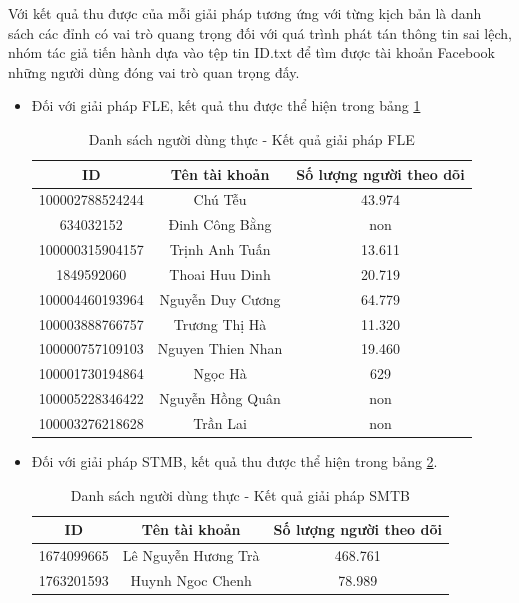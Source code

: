 Với kết quả thu được của mỗi giải pháp tương ứng với từng kịch bản là danh sách các đỉnh có vai trò quang trọng đối với quá trình phát tán thông tin sai lệch, nhóm tác giả tiến hành dựa vào tệp tin ID.txt để tìm được tài khoản Facebook những người dùng đóng vai trò quan trọng đấy.

\begin{itemize}
	\item Đối với giải pháp FLE, kết quả thu được thể hiện trong bảng \ref{anhxafle}
	\begin{table} [H]
		\centering
		\begin{tabular}{|c|c|c|}
			\hline
			\textbf{ID} & \textbf{Tên tài khoản} & \textbf{Số lượng người theo dõi}\\
			\hline
			100002788524244 & Chú Tễu & 43.974\\
			\hline
			634032152 & Đinh Công Bằng & non\\
			\hline
			100000315904157 & Trịnh Anh Tuấn & 13.611\\
			\hline
			1849592060 & Thoai Huu Dinh & 20.719\\
			\hline
			100004460193964 & Nguyễn Duy Cương & 64.779\\
			\hline
			100003888766757 & Trương Thị Hà & 11.320\\
			\hline 
			100000757109103 & Nguyen Thien Nhan & 19.460\\
			\hline 
			100001730194864 & Ngọc Hà & 629\\
			\hline
			100005228346422 & Nguyễn Hồng Quân & non\\
			\hline
			100003276218628 & Trần Lai & non\\
			\hline
		\end{tabular}
		\caption{Danh sách người dùng thực - Kết quả giải pháp FLE}
		\label{anhxafle} 
	\end{table}
	
	\item Đối với giải pháp STMB, kết quả thu được thể hiện trong bảng \ref{anhxastmb}.
	
	\begin{table} [H]
		\centering
		\begin{tabular}{|c|c|c|}
			\hline
			\textbf{ID} & \textbf{Tên tài khoản} & \textbf{Số lượng người theo dõi}\\
			\hline
			1674099665 & Lê Nguyễn Hương Trà & 468.761\\
			\hline
			1763201593 & Huynh Ngoc Chenh & 78.989\\
			\hline
		\end{tabular}
		\caption{Danh sách người dùng thực - Kết quả giải pháp SMTB}
		\label{anhxastmb} 
	\end{table}
	
\end{itemize}

